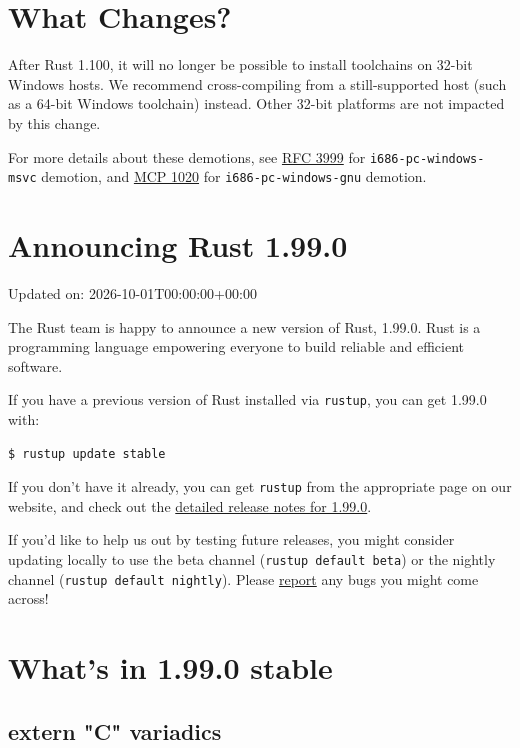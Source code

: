 \documentclass[11pt,a4paper]{article}
\begin{document}
\section{What Changes?}

After Rust 1.100, it will no longer be possible to install toolchains on 32-bit Windows hosts. We recommend cross-compiling from a still-supported host (such as a 64-bit Windows toolchain) instead. Other 32-bit platforms are not impacted by this change.

For more details about these demotions, see \href{https://github.com/rust-lang/rfcs/blob/51783df9a76c355de7ceebeae101cba47f8ca463/text/3999-std-only-i686-msvc.md}{RFC 3999} for \texttt{i686-pc-windows-msvc} demotion, and \href{https://github.com/rust-lang/compiler-team/issues/1020}{MCP 1020} for \texttt{i686-pc-windows-gnu} demotion.

\section{Announcing Rust 1.99.0}

Updated on: 2026-10-01T00:00:00+00:00

The Rust team is happy to announce a new version of Rust, 1.99.0. Rust is a programming language empowering everyone to build reliable and efficient software.

If you have a previous version of Rust installed via \texttt{rustup}, you can get 1.99.0 with:

\begin{verbatim}
$ rustup update stable
\end{verbatim}

If you don't have it already, you can get \texttt{rustup} from the appropriate page on our website, and check out the \href{https://doc.rust-lang.org/stable/releases.html\#version-1990-2026-10-01}{detailed release notes for 1.99.0}.

If you'd like to help us out by testing future releases, you might consider updating locally to use the beta channel (\texttt{rustup default beta}) or the nightly channel (\texttt{rustup default nightly}). Please \href{https://github.com/rust-lang/rust/issues/new/choose}{report} any bugs you might come across!

\section{What's in 1.99.0 stable}

\subsection{extern "C" variadics}
\end{document}
